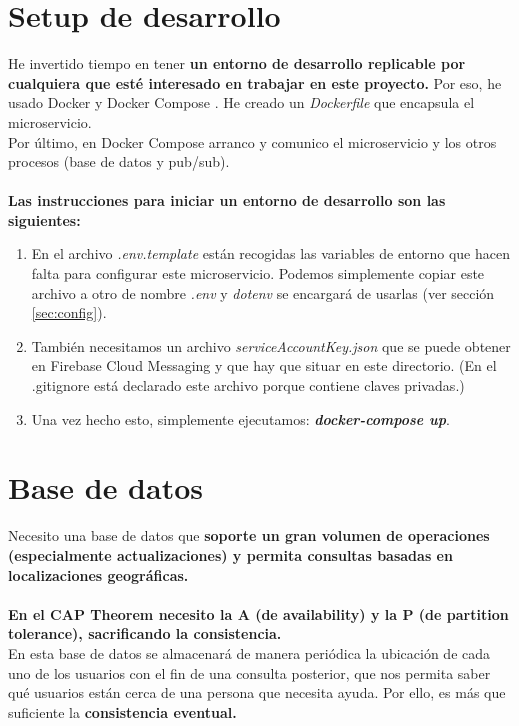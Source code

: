 \section{Setup de desarrollo}\label{sec:dev}

He invertido tiempo en tener \textbf{un entorno de desarrollo replicable por cualquiera que esté interesado en trabajar en este proyecto.}
Por eso, he usado Docker y Docker Compose \cite{docker}. He creado un \textit{Dockerfile} que encapsula el microservicio. 
\\ Por último, en Docker Compose arranco y comunico el microservicio y los otros procesos (base de datos y pub/sub). \\ \\
\textbf{Las instrucciones para iniciar un entorno de desarrollo son las siguientes:}

\begin{enumerate}
	\item En el archivo \textit{.env.template} están recogidas las variables de entorno que hacen falta para configurar este microservicio.
Podemos simplemente copiar este archivo a otro de nombre \textit{.env} y \textit{dotenv} se encargará de usarlas (ver sección \ref{sec:config}).
\item También necesitamos un archivo \textit{serviceAccountKey.json} que se puede obtener en Firebase Cloud Messaging \cite{firebase} y que hay que situar en este directorio. 
(En el .gitignore está declarado este archivo porque contiene claves privadas.)
\item Una vez hecho esto, simplemente ejecutamos: \textbf{\textit{docker-compose up}}.
\end{enumerate}

\section{Base de datos}

Necesito una base de datos que \textbf{soporte un gran volumen de operaciones (especialmente actualizaciones) y permita consultas basadas en localizaciones geográficas.} \\ \\
\textbf{En el CAP Theorem \cite{cap} necesito la A (de availability) y la P (de partition tolerance), sacrificando la consistencia.}
\\
En esta base de datos se almacenará de manera periódica la ubicación de cada uno de los usuarios con el fin de una consulta posterior, que nos permita saber qué usuarios
están cerca de una persona que necesita ayuda. Por ello, es más que suficiente la \textbf{consistencia eventual.}

